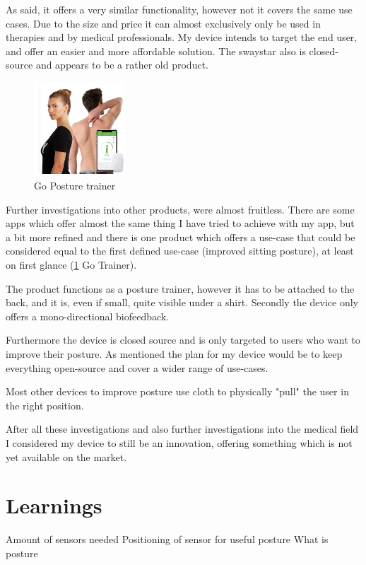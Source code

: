 As said, it offers a very similar functionality, however not it covers the same use cases. Due to the size and price it can almost exclusively only be used in therapies and by medical professionals. My device intends to target the end user, and offer an easier and more affordable solution. The swaystar also is closed-source and appears to be a rather old product.


\newpage

\begin{figure}
  \begin{center}
\includegraphics[width=0.3\textwidth]{images/Screenshot_3.png}
  \end{center}
  \caption{Go Posture trainer}
  \label{fig:gotrainer}
\end{figure}

Further investigations into other products, were almost fruitless. There are some apps which offer almost the same thing I have tried to achieve with my app, but a bit more refined and there is one product which offers a use-case that could be considered equal to the first defined use-case (improved sitting posture), at least on first glance (\ref{fig:gotrainer} Go Trainer). 

The product functions as a posture trainer, however it has to be attached to the back, and it is, even if small, quite visible under a shirt. Secondly the device only offers a mono-directional biofeedback. \cite{HowToImp2:online}

Furthermore the device is closed source and is only targeted to users who want to improve their posture. As mentioned the plan for my device would be to keep everything open-source and cover a wider range of use-cases. 

Most other devices to improve posture use cloth to physically "pull" the user in the right position.

After all these investigations and also further investigations into the medical field I considered my device to still be an innovation, offering something which is not yet available on the market.

\section{Learnings}

Amount of sensors needed
Positioning of sensor for useful posture
What is posture